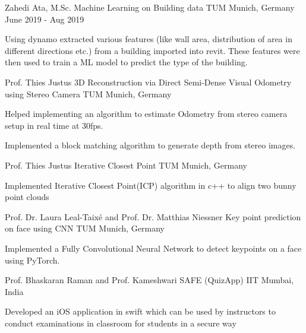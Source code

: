 \begin{cventries}
	\cventry
	{Zahedi Ata, M.Sc.} %
	{Machine Learning on Building data} %
	{TUM Munich, Germany} %
	{June 2019 - Aug 2019} %
	{
		\begin{cvitems} %
			\item {Using dynamo extracted various features (like wall area, distribution of area in different directions etc.) from a building imported into revit. These features were then used to train a ML model to predict the type of the building.}
		\end{cvitems}
	}

  	\cventry
    {Prof. Thies Justus} %
    {3D Reconstruction via Direct Semi-Dense Visual Odometry using Stereo Camera} %
    {TUM Munich, Germany} %
    {} %
    {
      \begin{cvitems} %
      	\item {Helped implementing an algorithm to estimate Odometry from stereo camera setup in real time at 30fps.}
		\item {Implemented a block matching algorithm to generate depth from stereo images.}
      \end{cvitems}
    }

	\cventry
	{Prof. Thies Justus} %
	{Iterative Closest Point} %
	{TUM Munich, Germany} %
	{} %
	{
		\begin{cvitems} %
			\item {Implemented Iterative Closest Point(ICP) algorithm in c++ to align two bunny point clouds}
		\end{cvitems}
	}

	\cventry
	{Prof. Dr. Laura Leal-Taixé and Prof. Dr. Matthias Niessner} %
	{Key point prediction on face using CNN} %
	{TUM Munich, Germany} %
	{} %
	{
		\begin{cvitems} %
			\item {Implemented a Fully Convolutional Neural Network to detect keypoints on a face using PyTorch.}
		\end{cvitems}
	}
	
	\cventry
	{Prof. Bhaskaran Raman and Prof. Kameshwari} %
	{SAFE (QuizApp)} %
	{IIT Mumbai, India} %
	{} %
	{
		\begin{cvitems} %
			\item {Developed an iOS application in swift which can be used by instructors to conduct examinations in classroom for students in a secure way}
		\end{cvitems}
	}
	

\end{cventries}
